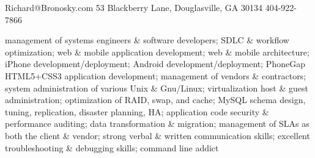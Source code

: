 \documentclass[10pt]{article}
\begin{document}
{Richard@Bronosky.com}
{53 Blackberry Lane, Douglasville, GA 30134}
{404-922-7866}

\begin{longtext}
    management of systems engineers \& software developers;
    SDLC \& workflow optimization;
    web \& mobile application development;
    web \& mobile architecture;
    iPhone development/deployment;
    Android development/deployment;
    PhoneGap HTML5+CSS3 application development;
    management of vendors \& contractors;
    system administration of various Unix \& Gnu/Linux;
    virtualization host \& guest administration;
    optimization of RAID, swap, and cache;
    MySQL schema design, tuning, replication, disaster planning, HA;
    application code security \& performance auditing;
    data transformation \& migration;
    management of SLAs as both the client \& vendor;
    strong verbal \& written communication skills;
    excellent troubleshooting \& debugging skills;
    command line addict
\end{longtext}
\shortspace




\end{document}
